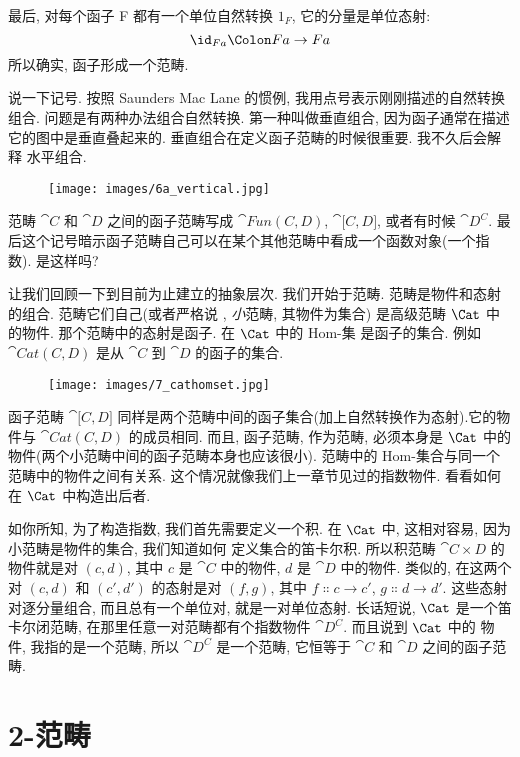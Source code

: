 最后, 对每个函子 F 都有一个单位自然转换 $1_F$, 它的分量是单位态射:
\[\id_{F a} \Colon F a \to F a\]
所以确实, 函子形成一个范畴.

说一下记号. 按照 Saunders Mac Lane 的惯例, 我用点号表示刚刚描述的自然转换组合. 问题是有两种办法组合自然转换.
第一种叫做垂直组合, 因为函子通常在描述它的图中是垂直叠起来的. 垂直组合在定义函子范畴的时候很重要. 我不久后会解释
水平组合.

\begin{figure}[H]
  \centering
  \texttt{[image: images/6a\_vertical.jpg]}
\end{figure}

\noindent
范畴 $\cat{C}$ 和 $\cat{D}$ 之间的函子范畴写成 ${\cat{Fun(C, D)}}$, $\cat{{[}C, D{]}}$, 或者有时候
$\cat{D^C}$. 最后这个记号暗示函子范畴自己可以在某个其他范畴中看成一个函数对象(一个指数). 是这样吗?

让我们回顾一下到目前为止建立的抽象层次. 我们开始于范畴. 范畴是物件和态射的组合. 范畴它们自己(或者严格说
, \emph{小}范畴, 其物件为集合) 是高级范畴 $\Cat$ 中的物件. 那个范畴中的态射是函子. 在 $\Cat$ 中的 Hom-集
是函子的集合. 例如 $\cat{Cat(C, D)}$ 是从 $\cat{C}$ 到 $\cat{D}$ 的函子的集合.

\begin{figure}[H]
  \centering
  \texttt{[image: images/7\_cathomset.jpg]}
\end{figure}

\noindent
函子范畴 $\cat{{[}C, D{]}}$ 同样是两个范畴中间的函子集合(加上自然转换作为态射).它的物件与 $\cat{Cat(C, D)}$
的成员相同. 而且, 函子范畴, 作为范畴, 必须本身是 $\Cat$ 中的物件(两个小范畴中间的函子范畴本身也应该很小).
范畴中的 Hom-集合与同一个范畴中的物件之间有关系. 这个情况就像我们上一章节见过的指数物件. 看看如何在 $\Cat$
中构造出后者.

如你所知, 为了构造指数, 我们首先需要定义一个积. 在 $\Cat$ 中, 这相对容易, 因为小范畴是物件的集合, 我们知道如何
定义集合的笛卡尔积. 所以积范畴 $\cat{C\times D}$ 的物件就是对 $(c, d)$, 其中 $c$ 是 $\cat{C}$ 中的物件,
$d$ 是 $\cat{D}$ 中的物件. 类似的, 在这两个对 $(c, d)$ 和 $(c', d')$ 的态射是对 $(f, g)$, 其中
$f \Colon c \to c'$, $g \Colon d \to d'$. 这些态射对逐分量组合, 而且总有一个单位对, 就是一对单位态射.
长话短说, $\Cat$ 是一个笛卡尔闭范畴, 在那里任意一对范畴都有个指数物件 $\cat{D^C}$. 而且说到 $\Cat$ 中的
物件, 我指的是一个范畴, 所以 $\cat{D^C}$ 是一个范畴, 它恒等于 $\cat{C}$ 和 $\cat{D}$ 之间的函子范畴.

\section{2-范畴}

